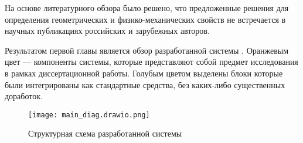 На основе литературного обзора было решено, что предложенные решения для определения геометрических и физико-механических свойств не встречается в научных публикациях российских и зарубежных авторов.

Результатом первой главы является обзор разработанной системы . Оранжевым цвет --- компоненты системы, которые представляют собой предмет исследования в рамках диссертационной работы. Голубым цветом выделены блоки которые были интегрированы как стандартные средства, без каких-либо существенных доработок.
\begin{figure}[ht!]
    \centering\texttt{[image: main\_diag.drawio.png]}
    \caption{Структурная схема разработанной системы}
    \label{fig:diag_system.png}
\end{figure}


